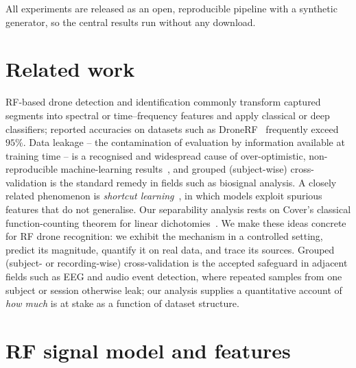 \documentclass[11pt]{article}
\begin{document}
All experiments are released as an open, reproducible pipeline with a synthetic generator, so the central results run without any download.

\section{Related work}
RF-based drone detection and identification commonly transform captured segments into spectral or time--frequency features and apply classical or deep classifiers; reported accuracies on datasets such as DroneRF~\cite{dronerf} frequently exceed $95\%$. Data leakage -- the contamination of evaluation by information available at training time -- is a recognised and widespread cause of over-optimistic, non-reproducible machine-learning results~\cite{kapoor}, and grouped (subject-wise) cross-validation is the standard remedy in fields such as biosignal analysis. A closely related phenomenon is \emph{shortcut learning}~\cite{geirhos}, in which models exploit spurious features that do not generalise. Our separability analysis rests on Cover's classical function-counting theorem for linear dichotomies~\cite{cover}. We make these ideas concrete for RF drone recognition: we exhibit the mechanism in a controlled setting, predict its magnitude, quantify it on real data, and trace its sources. Grouped (subject- or recording-wise) cross-validation is the accepted safeguard in adjacent fields such as EEG and audio event detection, where repeated samples from one subject or session otherwise leak; our analysis supplies a quantitative account of \emph{how much} is at stake as a function of dataset structure.

\section{RF signal model and features}
\label{sec:rf}
\end{document}
